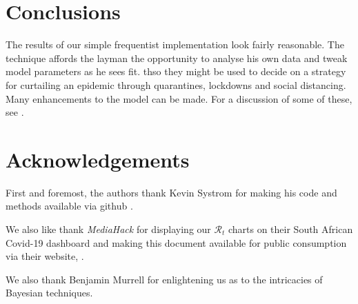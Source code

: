 \documentclass[11pt]{article}
\begin{document}
\section{Conclusions}
The results of our simple frequentist implementation look fairly reasonable.
The technique affords the layman the opportunity to analyse his own data
and tweak model parameters as he sees fit.
thso they might be
used to decide on a strategy for curtailing an epidemic through
quarantines, lockdowns and social distancing.  
Many enhancements to the model can be made.  For a discussion 
of some of these, see \cite{systrom}.  

\section{Acknowledgements}

First and foremost, the authors thank Kevin Systrom for making his code and methods
available via github \cite{systrom}.

We also like thank {\it MediaHack} for displaying our $\mathcal{R}_t$ charts
on their South African Covid-19 dashboard and making this document available for 
public consumption via their website, \cite{mediahack}.

We also thank Benjamin Murrell for enlightening us as to the intricacies of Bayesian techniques.
\end{document}
